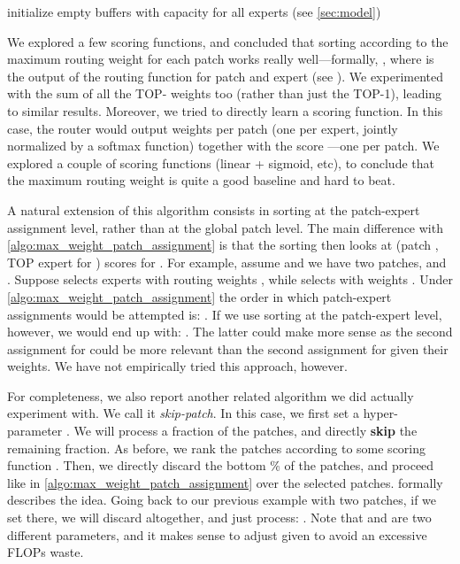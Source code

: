 \documentclass{article}
\newcommand{\maxrouting}{Batch Prioritized Routing}
\begin{document}
\begin{algorithm}[H]
\SetAlgoLined
{}
 initialize empty buffers with capacity  for all experts  (see \cref{sec:model})\;
 \;
 \caption{\maxrouting{} Allocation}
 \label{algo:max_weight_patch_assignment}
\end{algorithm}
We explored a few scoring functions, and concluded that sorting according to the maximum routing weight for each patch  works really well---formally, , where  is the output of the routing function  for patch  and expert  (see ).
We experimented with the sum of all the TOP- weights too (rather than just the TOP-1), leading to similar results.
Moreover, we tried to directly learn a scoring function.
In this case, the router would output  weights per patch (one per expert, jointly normalized by a softmax function) together with the score  ---one per patch.
We explored a couple of scoring functions (linear + sigmoid, etc), to conclude that the maximum routing weight is quite a good baseline and hard to beat.

A natural extension of this algorithm consists in sorting at the patch-expert assignment level, rather than at the global patch level.
The main difference with \cref{algo:max_weight_patch_assignment} is that the sorting then looks at (patch , TOP expert for ) scores for .
For example, assume  and we have two patches,  and .
Suppose  selects experts  with routing weights , while  selects  with weights .
Under \cref{algo:max_weight_patch_assignment} the order in which patch-expert assignments would be attempted is: .
If we use sorting at the patch-expert level, however, we would end up with: .
The latter could make more sense as the second assignment for  could be more relevant than the second assignment for  given their weights.
We have not empirically tried this approach, however.


For completeness, we also report another related algorithm we did actually experiment with.
We call it \emph{skip-patch}.
In this case, we first set a hyper-parameter .
We will process a fraction  of the patches, and directly \textbf{skip} the remaining  fraction.
As before, we rank the  patches according to some scoring function .
Then, we directly discard the bottom \% of the patches, and proceed like in \cref{algo:max_weight_patch_assignment} over the selected  patches.
 formally describes the idea.
Going back to our previous example with two patches, if we set  there, we will discard  altogether, and just process: .
Note that  and  are two different parameters, and it makes sense to adjust  given  to avoid an excessive FLOPs waste.
\end{document}
